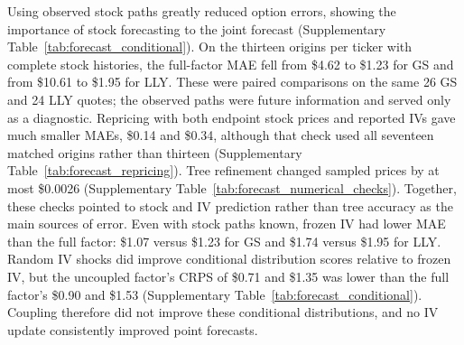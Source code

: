Using observed stock paths greatly reduced option errors, showing the importance of stock forecasting to the joint forecast (Supplementary Table~\ref{tab:forecast_conditional}). On the thirteen origins per ticker with complete stock histories, the full-factor MAE fell from \$4.62 to \$1.23 for GS and from \$10.61 to \$1.95 for LLY. These were paired comparisons on the same 26 GS and 24 LLY quotes; the observed paths were future information and served only as a diagnostic. Repricing with both endpoint stock prices and reported IVs gave much smaller MAEs, \$0.14 and \$0.34, although that check used all seventeen matched origins rather than thirteen (Supplementary Table~\ref{tab:forecast_repricing}). Tree refinement changed sampled prices by at most \$0.0026 (Supplementary Table~\ref{tab:forecast_numerical_checks}). Together, these checks pointed to stock and IV prediction rather than tree accuracy as the main sources of error. Even with stock paths known, frozen IV had lower MAE than the full factor: \$1.07 versus \$1.23 for GS and \$1.74 versus \$1.95 for LLY. Random IV shocks did improve conditional distribution scores relative to frozen IV, but the uncoupled factor's CRPS of \$0.71 and \$1.35 was lower than the full factor's \$0.90 and \$1.53 (Supplementary Table~\ref{tab:forecast_conditional}). Coupling therefore did not improve these conditional distributions, and no IV update consistently improved point forecasts.

\FloatBarrier
